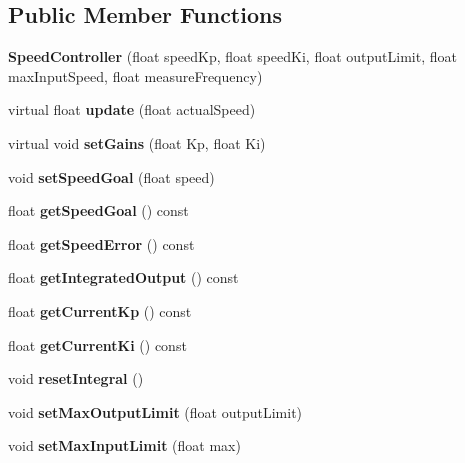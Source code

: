 \subsection*{Public Member Functions}
\begin{DoxyCompactItemize}
\item 
\mbox{\label{classSpeedController_a10f5e7980582db2e255de7cf9d66e856}} 
{\bfseries Speed\+Controller} (float speed\+Kp, float speed\+Ki, float output\+Limit, float max\+Input\+Speed, float measure\+Frequency)
\item 
\mbox{\label{classSpeedController_a41fe41e034744083a26b480b553a8d14}} 
virtual float {\bfseries update} (float actual\+Speed)
\item 
\mbox{\label{classSpeedController_ac67af974bf368278b374fcd087d59c68}} 
virtual void {\bfseries set\+Gains} (float Kp, float Ki)
\item 
\mbox{\label{classSpeedController_a8f37b6552568922257b0c3b90d377405}} 
void {\bfseries set\+Speed\+Goal} (float speed)
\item 
\mbox{\label{classSpeedController_a0931b1d9d1fc7797b55f0e4deb60e809}} 
float {\bfseries get\+Speed\+Goal} () const
\item 
\mbox{\label{classSpeedController_a517871bef2024f70423529ab53a0fbd6}} 
float {\bfseries get\+Speed\+Error} () const
\item 
\mbox{\label{classSpeedController_a0dab5da838b645bec1a3d176f156a643}} 
float {\bfseries get\+Integrated\+Output} () const
\item 
\mbox{\label{classSpeedController_aa712070aed0713b3a14e9d1854b302c0}} 
float {\bfseries get\+Current\+Kp} () const
\item 
\mbox{\label{classSpeedController_a688416ad5e983e9334293f02efcbe4fc}} 
float {\bfseries get\+Current\+Ki} () const
\item 
\mbox{\label{classSpeedController_a8bfce2940340df84734a8d8db4830c87}} 
void {\bfseries reset\+Integral} ()
\item 
\mbox{\label{classSpeedController_a0d99f4af7f92023565af20c794bc0742}} 
void {\bfseries set\+Max\+Output\+Limit} (float output\+Limit)
\item 
\mbox{\label{classSpeedController_a1fa6959297343de2b83ded015ea72df4}} 
void {\bfseries set\+Max\+Input\+Limit} (float max)
\end{DoxyCompactItemize}

